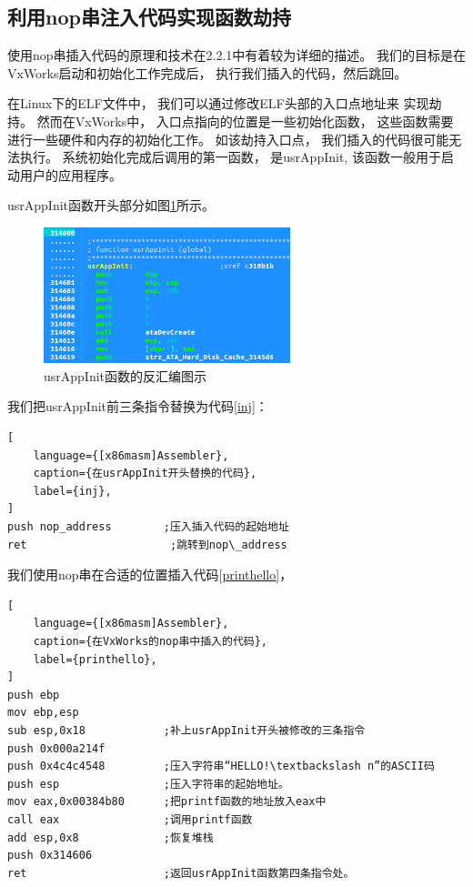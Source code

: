 \subsection{利用nop串注入代码实现函数劫持}

使用nop串插入代码的原理和技术在2.2.1中有着较为详细的描述。
我们的目标是在VxWorks启动和初始化工作完成后，
执行我们插入的代码，然后跳回。

在Linux下的ELF文件中，
我们可以通过修改ELF头部的入口点地址来
实现劫持。
然而在VxWorks中，
入口点指向的位置是一些初始化函数，
这些函数需要进行一些硬件和内存的初始化工作。
如该劫持入口点，
我们插入的代码很可能无法执行。
系统初始化完成后调用的第一函数，
是usrAppInit,
该函数一般用于启动用户的应用程序。

usrAppInit函数开头部分如图\ref{usr}所示。

\begin{figure}[h!]
    \centering
    \includegraphics[width=0.64\textwidth]{figure/usr.png}
    \caption{usrAppInit函数的反汇编图示}
    \label{usr}
\end{figure}

我们把usrAppInit前三条指令替换为代码\ref{inj}：

\begin{lstlisting}[
    language={[x86masm]Assembler},
    caption={在usrAppInit开头替换的代码},
    label={inj},
]
push nop_address        ;压入插入代码的起始地址
ret                      ;跳转到nop\_address
\end{lstlisting}


我们使用nop串在合适的位置插入代码\ref{printhello}，
\begin{lstlisting}[
    language={[x86masm]Assembler},
    caption={在VxWorks的nop串中插入的代码},
    label={printhello},
]
push ebp
mov ebp,esp
sub esp,0x18            ;补上usrAppInit开头被修改的三条指令
push 0x000a214f
push 0x4c4c4548         ;压入字符串“HELLO!\textbackslash n”的ASCII码
push esp                ;压入字符串的起始地址。  
mov eax,0x00384b80      ;把printf函数的地址放入eax中
call eax                ;调用printf函数
add esp,0x8             ;恢复堆栈
push 0x314606        
ret                     ;返回usrAppInit函数第四条指令处。
\end{lstlisting}

